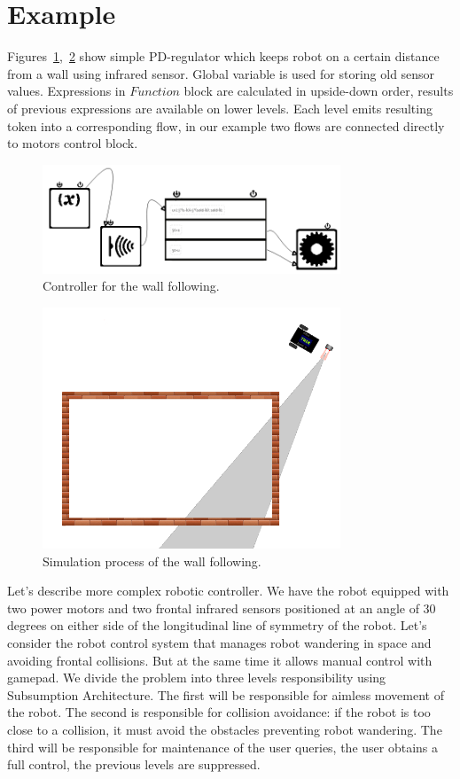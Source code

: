 \documentclass[conference,compsoc]{IEEEtran}
\begin{document}
\section{Example}
\label{sec:example}
Figures~\ref{image:boxC},~\ref{image:box} show simple PD-regulator which keeps robot on a certain distance from a wall using infrared sensor. Global variable is used for storing old sensor values. Expressions in $Function$ block are calculated in upside-down order, results of previous expressions are available on lower levels. Each level emits resulting token into a corresponding flow, in our example two flows are connected directly to motors control block.


\begin{figure}[ht]
	\centering
	\includegraphics[width=3.5in]{alongBoxCode.png}
	\caption{Controller for the wall following.}
	\label{image:boxC}
\end{figure}

\begin{figure}[ht]
	\centering
	\includegraphics[width=3.5in]{alongBoxModel.png}
	\caption{Simulation process of the wall following.}
	\label{image:box}
\end{figure}

Let's describe more complex robotic controller. We have the robot equipped with two power motors and two frontal infrared sensors positioned at an angle of 30 degrees on either side of the longitudinal line of symmetry of the robot. Let's consider the robot control system that manages robot wandering in space and avoiding frontal collisions. But at the same time it allows manual control with gamepad. We divide the problem into three levels responsibility using Subsumption Architecture. The first will be responsible for aimless movement of the robot. The second is responsible for collision avoidance: if the robot is too close to a collision, it must avoid the obstacles preventing robot wandering. The third will be responsible for maintenance of the user queries, the user obtains a full control, the previous levels are suppressed.
\end{document}
